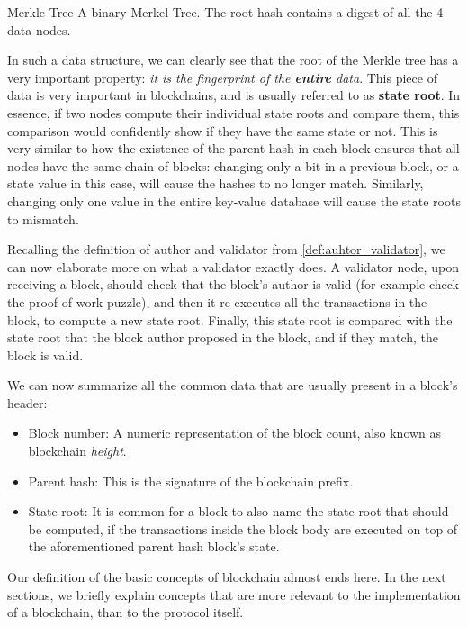 	{Merkle Tree} {A binary Merkel Tree. The root hash contains a digest of all the 4 data nodes.}

In such a data structure, we can clearly see that the root of the Merkle tree has a very important
property: \textit{it is the fingerprint of the \textbf{entire} data}. This piece of data is very
important in blockchains, and is usually referred to as \textbf{state root}. In essence, if two
nodes compute their individual state roots and compare them, this comparison would confidently show
if they have the same state or not. This is very similar to how the existence of the parent hash in
each block ensures that all nodes have the same chain of blocks: changing only a bit in a previous
block, or a state value in this case, will cause the hashes to no longer match. Similarly, changing
only one value in the entire key-value database will cause the state roots to mismatch.

Recalling the definition of author and validator from \ref{def:auhtor_validator}, we can now
elaborate more on what a validator exactly does. A validator node, upon receiving a block, should
check that the block's author is valid (for example check the proof of work puzzle), and then it
re-executes all the transactions in the block, to compute a new state root. Finally, this state root
is compared with the state root that the block author proposed in the block, and if they match, the
block is valid.

We can now summarize all the common data that are usually present in a block's header:

\begin{itemize}
	\item Block number: A numeric representation of the block count, also known as blockchain
	\textit{height}.
	\item Parent hash: This is the signature of the blockchain prefix.
	\item State root: It is common for a block to also name the state root that should be computed,
	if the transactions inside the block body are executed on top of the aforementioned parent hash
	block's state.
\end{itemize}

Our definition of the basic concepts of blockchain almost ends here. In the next sections, we
briefly explain concepts that are more relevant to the implementation of a blockchain, than to the
protocol itself.

